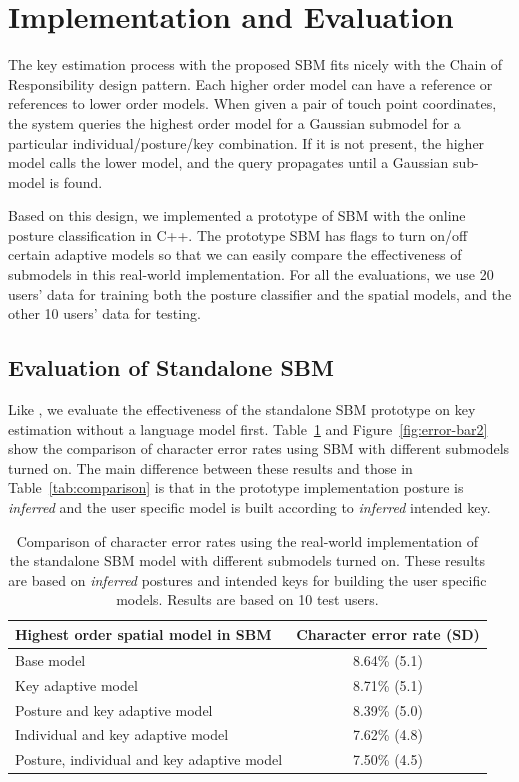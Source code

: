 \documentclass{sigchi}
\newcommand\tabhead[1]{\small\textbf{#1}}
\begin{document}
\section{Implementation and Evaluation}
The key estimation process with the proposed SBM fits nicely with the
Chain of Responsibility design pattern. Each higher order model can
have a reference or references to lower order models. When given a pair of touch
point coordinates, the system queries the highest order model for a Gaussian
submodel for a particular individual/posture/key combination. If it is not present, 
the higher model calls the lower model, and the
query propagates until a Gaussian sub-model is found. 

Based on this design, we implemented a prototype of SBM with the online posture 
classification in C++. The prototype SBM has flags to turn on/off certain adaptive
 models so that we can easily compare the effectiveness of submodels in this real-world implementation. 
 For all the evaluations, we use 20 users' data for training both the posture classifier 
 and the spatial models, and the other 10 users' data for testing. 

\subsection{Evaluation of Standalone SBM}
Like \cite{Findlater:2012, Rudchenko:2011}, we evaluate the effectiveness of the standalone SBM  prototype on key estimation without a language model first. 
Table~\ref{tab:off-device} and Figure~\ref{fig:error-bar2} show the comparison
of character error rates using SBM with different submodels turned on. The main difference between these results and those in Table~\ref{tab:comparison} is that in the prototype implementation posture is \textit{inferred} and the user specific model is built according to \textit{inferred} intended key.

\begin{table}[tb]
  \centering
  \begin{tabular}{|l|c|}
  \hline
  \tabhead{Highest order spatial model in SBM} &  
  \multicolumn{1}{|p{0.2\columnwidth}|}{\centering\tabhead{Character error rate
  (SD)}}
  \\
  \hline
 Base model & 8.64\% (5.1)\\
  \hline
  Key adaptive model & 8.71\% (5.1) \\
  \hline
    \multicolumn{1}{|p{0.7\columnwidth}|}{Posture and key adaptive model} &
    8.39\% (5.0)\\
  \hline
  Individual and key adaptive model  & 7.62\% (4.8)
  \\
  \hline
  Posture, individual and key adaptive model &  7.50\% (4.5)
  \\
  \hline
  \end{tabular}
  \caption{Comparison of character error rates using the real-world implementation of the standalone SBM model with different submodels turned on.  These results are based on \textit{inferred} postures and intended keys for building the user specific models. Results are based on 10 test users.}
  \label{tab:off-device}
\end{table}
\end{document}
